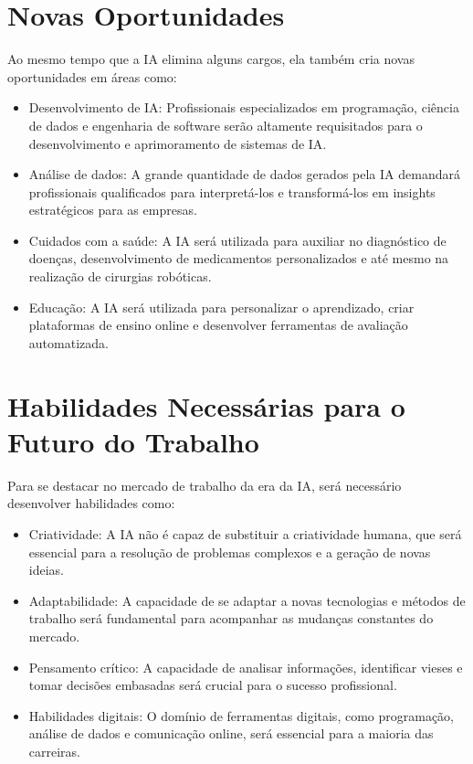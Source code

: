 \documentclass[12pt,twoside]{book}
\begin{document}
\section{Novas Oportunidades}

Ao mesmo tempo que a IA elimina alguns cargos, ela também cria novas oportunidades em áreas como:
\begin{itemize}
    \item Desenvolvimento de IA: Profissionais especializados em programação, ciência de dados e engenharia de software serão altamente requisitados para o desenvolvimento e aprimoramento de sistemas de IA.
    \item Análise de dados: A grande quantidade de dados gerados pela IA demandará profissionais qualificados para interpretá-los e transformá-los em insights estratégicos para as empresas.
    \item Cuidados com a saúde: A IA será utilizada para auxiliar no diagnóstico de doenças, desenvolvimento de medicamentos personalizados e até mesmo na realização de cirurgias robóticas.
    \item Educação: A IA será utilizada para personalizar o aprendizado, criar plataformas de ensino online e desenvolver ferramentas de avaliação automatizada.
\end{itemize}

\section{Habilidades Necessárias para o Futuro do Trabalho}

Para se destacar no mercado de trabalho da era da IA, será necessário desenvolver habilidades como:
\begin{itemize}
    \item Criatividade: A IA não é capaz de substituir a criatividade humana, que será essencial para a resolução de problemas complexos e a geração de novas ideias.
    \item Adaptabilidade: A capacidade de se adaptar a novas tecnologias e métodos de trabalho será fundamental para acompanhar as mudanças constantes do mercado.
    \item Pensamento crítico: A capacidade de analisar informações, identificar vieses e tomar decisões embasadas será crucial para o sucesso profissional.
    \item Habilidades digitais: O domínio de ferramentas digitais, como programação, análise de dados e comunicação online, será essencial para a maioria das carreiras.
\end{itemize}
\end{document}
